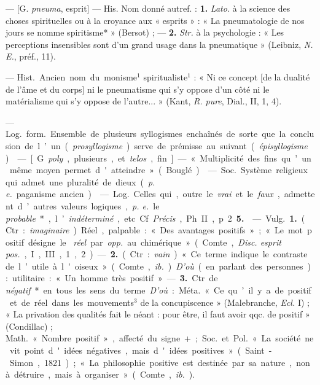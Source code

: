 \begin{itemize}[leftmargin=1cm, label=, itemsep=1pt]
 — [G. {\it pneuma}, esprit] — His. Nom donné
autref. : {\bf 1.} {\it Lato.} à la science des choses spirituelles ou à la
croyance aux « esprits » : « La pneumatologie
de nos jours se nomme spiritisme* » (Bersot) ; — {\bf 2.} {\it Str.} à la
psychologie : « Les perceptions insensibles sont d’un grand usage dans la
pneumatique » (Leibniz, {\it N. E.}, préf., 11).

 — \si{Hist.} Ancien nom du monisme$^1$ spiritualiste$^1$ : «
Ni ce concept [de la dualité de l'âme et du corps] ni le pneumatisme qui s’y
oppose d’un côté ni le matérialisme qui s’y oppose de l’autre... » (Kant,
{\it R. pure}, Dial., II, 1, 4).

 — \si{Log.} \si{form.} Ensemble de plusieurs syllogismes
enchaînés de sorte que la conclusion de l’un ({\it prosyllogisme}) serve de
prémisse au suivant ({\it épisyllogisme}).

 — [G. {\it poly}, plusieurs, et {\it telos}, fin] — «
Multiplicité des fins qu’un même moyen permet d'atteindre » (Bouglé).

 — \si{Soc.} Système religieux qui admet une pluralité de
dieux ({\it p. e.} paganisme ancien).

 — \si{Log.} Celles qui, outre le {\it vrai} et
le {\it faux}, admettent d’autres valeurs logiques, {\it p. e.} le {\it
probable}*, l’{\it indéterminé}, etc. Cf. {\it Précis}, Ph. II, p. 2 {\bf 5.}

 — \si{Vulg.} {\bf 1.} (Ctr. : {\it imaginaire}). Réel,
palpable : « Des avantages positifs » ; « Le mot positif désigne le {\it
réel} par {\it opp.} au chimérique » (Comte, {\it Disc. esprit pos.}, I, III,
1, 2). —  {\bf 2.} (Ctr. : {\it vain}). « Ce terme indique le contraste de
l’utile à l'oiseux » (Comte, {\it ib.}). {\it D'où} (en parlant des
personnes) : utilitaire : « Un homme très positif. » — {\bf 3.} Ctr. de {\it
négatif}* en tous les sens du terme. {\it D'où} : \si{Méta.} « Ce qu’il y a
de positif et de réel dans les mouvements$^3$ de la concupiscence »
(Malebranche, {\it Ecl.} I) ; « La privation des qualités fait le néant :
pour être, il faut avoir qqc. de positif » (Condillac) ; \si{Math.} « Nombre
positif », affecté du signe + ; \si{Soc.} et \si{Pol.} « La société ne vit
point d'idées négatives, mais d'idées positives » (Saint-Simon, 1821) ; « La
philosophie positive est destinée par sa nature, non à détruire, mais à
organiser » (Comte, {\it ib.}).


\end{itemize}

